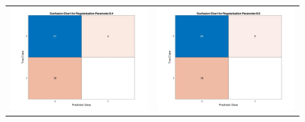 \documentclass[11pt]{article}
\begin{document}
\begin{figure}[H]
\begin{adjustbox}{width=0.8\paperwidth}
\begin{tabular}{c c}
			\includegraphics{Codes/Results/L1 Logistic Train/Conf_Chart_Reg_Par_0.4} & \includegraphics{Codes/Results/L1 Logistic Train/Conf_Chart_Reg_Par_0.5}\\

\end{tabular}
\end{adjustbox}
\end{figure}
\end{document}
